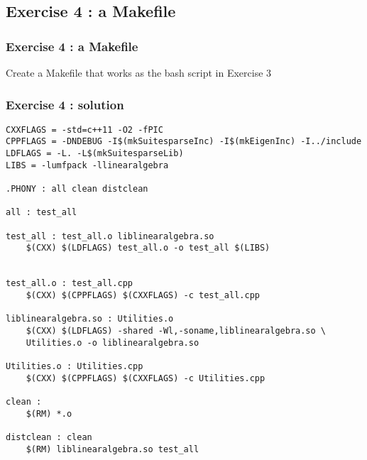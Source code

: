 \documentclass[9pt]{beamer}
\begin{document}
\subsection{Exercise 4 : a Makefile}
\begin{frame}\frametitle{Exercise 4 : a Makefile}
Create a Makefile that works as the bash script in Exercise 3
\end{frame}

\begin{frame}\frametitle{Exercise 4 : solution}
\begin{verbatim}
CXXFLAGS = -std=c++11 -O2 -fPIC
CPPFLAGS = -DNDEBUG -I$(mkSuitesparseInc) -I$(mkEigenInc) -I../include
LDFLAGS = -L. -L$(mkSuitesparseLib)
LIBS = -lumfpack -llinearalgebra

.PHONY : all clean distclean

all : test_all

test_all : test_all.o liblinearalgebra.so
	$(CXX) $(LDFLAGS) test_all.o -o test_all $(LIBS)


test_all.o : test_all.cpp
	$(CXX) $(CPPFLAGS) $(CXXFLAGS) -c test_all.cpp

liblinearalgebra.so : Utilities.o
	$(CXX) $(LDFLAGS) -shared -Wl,-soname,liblinearalgebra.so \
	Utilities.o -o liblinearalgebra.so

Utilities.o : Utilities.cpp
	$(CXX) $(CPPFLAGS) $(CXXFLAGS) -c Utilities.cpp

clean :
	$(RM) *.o 

distclean : clean
	$(RM) liblinearalgebra.so test_all
\end{verbatim}
\end{frame}
\end{document}
